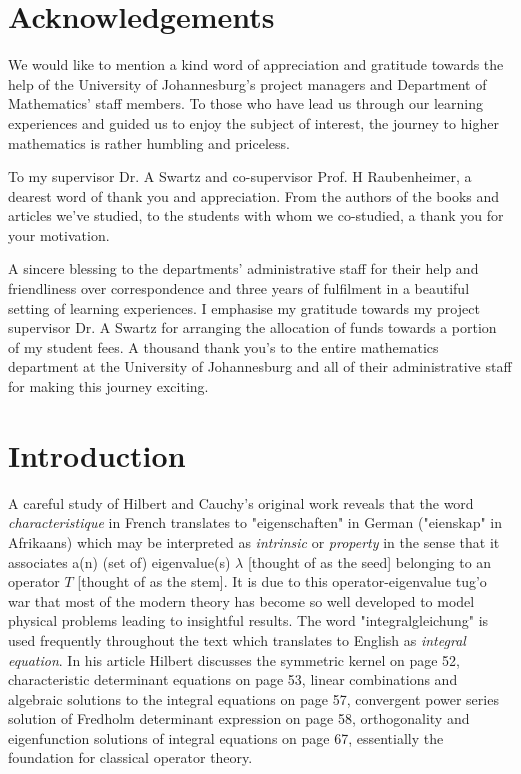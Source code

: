 \documentclass[12pt, oneside]{book}
\begin{document}
\chapter*{Acknowledgements}
%


We would like to mention a kind word of appreciation and gratitude towards the help of the University of Johannesburg's project managers and Department of Mathematics' staff members.  To those who have lead us through our learning experiences and guided us to enjoy the subject of interest, the journey to higher mathematics is rather humbling and priceless. 
\par \medskip
\noindent To my supervisor Dr. A Swartz and co-supervisor Prof. H Raubenheimer, a dearest word of thank you and appreciation. From the authors of the books and articles we've studied, to the students with whom we co-studied, a thank you for your motivation. 
\par \medskip
\noindent A sincere blessing to the departments' administrative staff for their help and friendliness over correspondence and three years of fulfilment in a beautiful setting of learning experiences. I emphasise my gratitude towards my project supervisor Dr. A Swartz for arranging the allocation of funds towards a portion of my student fees. A thousand thank you's to the entire mathematics department at the University of Johannesburg and all of their administrative staff for making this journey exciting.

\newpage


\cleardoublepage
\setcounter{page}{1}



\chapter*{Introduction}
%

A careful study of Hilbert \cite{DH1} and Cauchy's \cite{ALC} original work reveals that the 
word \textit{characteristique} in French translates to "eigenschaften" in German ("eienskap" in Afrikaans) which may be interpreted as \textit{intrinsic} or \textit{property} in the sense that it associates 
a(n) (set of) eigenvalue(s) $\lambda$ [thought of as the seed] belonging to an operator $T$ [thought of as the stem]. 
It is due to this operator-eigenvalue tug'o war that most of the modern theory has become so well developed to model physical problems leading to insightful results. 
The word "integralgleichung" is used frequently throughout the text which translates to English as \textit{integral equation}. 
In his article Hilbert discusses the symmetric kernel on page 52, characteristic determinant equations on page 53, linear combinations and algebraic solutions to the integral equations on page 57, convergent power series solution of 
Fredholm determinant expression on page 58, orthogonality and eigenfunction solutions of integral equations on page 67, essentially the foundation for classical operator theory.
\end{document}
